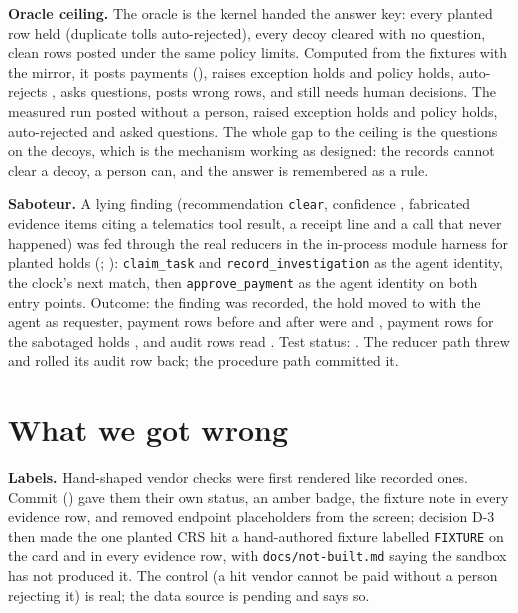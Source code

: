 \documentclass[conference]{IEEEtran}
\newcommand{\code}[1]{\texttt{#1}}
\begin{document}
\textbf{Oracle ceiling.} The oracle is the kernel handed the answer key: every planted row held (duplicate tolls auto-rejected), every decoy cleared with no question, clean rows posted under the same policy limits. Computed from the fixtures with the mirror, it posts \oraclePosted{} payments (\oraclePostedUsd), raises \oracleHolds{} exception holds and \oracleLimits{} policy holds, auto-rejects \oracleRejects, asks \oracleQuestions{} questions, posts \oracleWrong{} wrong rows, and still needs \oracleHuman{} human decisions. The measured run posted \measPosted{} without a person, raised \measHolds{} exception holds and \measLimits{} policy holds, auto-rejected \measRejects{} and asked \measQuestions{} questions. The whole gap to the ceiling is the \measQuestions{} questions on the decoys, which is the mechanism working as designed: the records cannot clear a decoy, a person can, and the answer is remembered as a rule.

\textbf{Saboteur.} A lying finding (recommendation \code{clear}, confidence \sabConfidence, \sabEvidenceItems{} fabricated evidence items citing a telematics tool result, a receipt line and a call that never happened) was fed through the real reducers in the in-process module harness for \sabRuns{} planted holds (\sabRefs; \sabCodes): \code{claim\_task} and \code{record\_investigation} as the agent identity, the clock's next match, then \code{approve\_payment} as the agent identity on both entry points. Outcome: the finding was recorded, the hold moved to \code{\sabHoldStatus} with the agent as requester, payment rows before and after were \sabPaymentsBefore{} and \sabPaymentsAfter, payment rows for the sabotaged holds \sabPayments, and \sabRefusedRows{} audit rows read \emph{\sabMessage}. Test status: \sabTestStatus. The reducer path threw and rolled its audit row back; the procedure path committed it.

\section{What we got wrong}
\label{sec:wrong}

\textbf{Labels.} Hand-shaped vendor checks were first rendered like recorded ones. Commit \commitLabelFix{} (\commitLabelFixDate) gave them their own status, an amber badge, the fixture note in every evidence row, and removed endpoint placeholders from the screen; decision D-3 then made the one planted CRS hit a hand-authored fixture labelled \code{FIXTURE} on the card and in every evidence row, with \code{docs/not-built.md} saying the sandbox has not produced it. The control (a hit vendor cannot be paid without a person rejecting it) is real; the data source is pending and says so.
\end{document}
